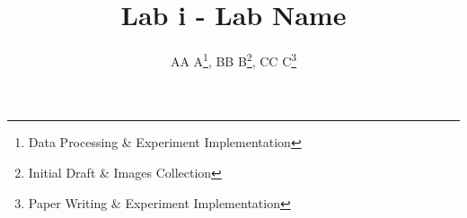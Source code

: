 \title{
  \textbf{Lab i - Lab Name}
}
\author{
  AA A\thanks{Data Processing \& Experiment Implementation},
  BB B\thanks{Initial Draft \& Images Collection},
  CC C\thanks{Paper Writing \& Experiment Implementation}
}
\date{}